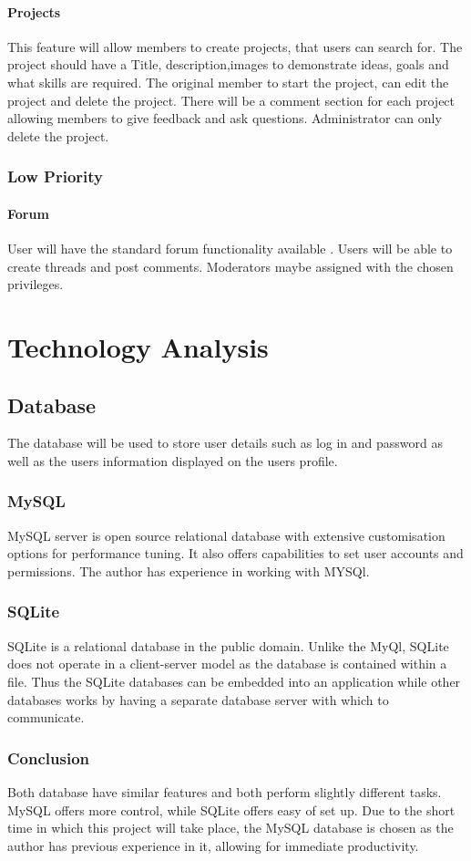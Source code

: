 \documentclass[a4paper,oneside,11pt]{report}
\begin{document}
\subsubsection{Projects}
This feature will allow members to create projects, that users can search for. The project should have a Title, description,images to demonstrate ideas, goals and what skills are required. The original member to start the project, can edit the project and delete the project. There will be a comment section for each project allowing members to give feedback and ask questions. Administrator can only delete the project.
\subsection{Low Priority}
\subsubsection{Forum}
User will have the standard forum functionality available . Users will be able to create threads and post comments. Moderators maybe assigned with the chosen privileges. 

\chapter{Technology Analysis}
\section{Database}
The database will be used to store user details such as log in and password as well as the users information displayed on the users profile.
\subsection{MySQL}
MySQL server is open source relational database with extensive customisation options for performance tuning. It also offers capabilities to set user accounts and permissions. The author has experience in working with MYSQl.
\subsection{SQLite}
SQLite is a relational database in the public domain. Unlike the MyQl, SQLite does not operate in a client-server model as the database is contained within a file. Thus the SQLite databases can be embedded into an application while other databases works by having a separate database server with which to communicate.
\subsection{Conclusion}
Both database have similar features and both perform slightly different tasks. MySQL offers more control, while SQLite offers easy of set up. Due to the short time in which this project will take place, the MySQL database is chosen as the author has previous experience in it, allowing for immediate productivity.
\end{document}

